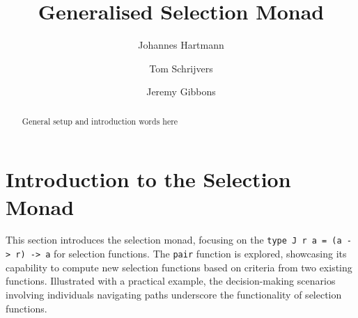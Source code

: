 \documentclass[runningheads]{llncs}
\begin{document}
\title{Generalised Selection Monad}

\author{
    Johannes Hartmann \and 
    Tom Schrijvers\and 
    Jeremy Gibbons
}
%


%
\maketitle              %
%
\begin{abstract}
General setup and introduction words here

\end{abstract}
%
%
%
\begin{Shaded}
\begin{Highlighting}[]
\end{Highlighting}
\end{Shaded}

\begin{Shaded}
\begin{Highlighting}[]
  \NormalTok{, }\NormalTok{)}
\end{Highlighting}
\end{Shaded}

\section{Introduction to the Selection
Monad}\label{introduction-to-the-selection-monad}

This section introduces the selection monad, focusing on the
\texttt{type\ J\ r\ a\ =\ (a\ -\textgreater{}\ r)\ -\textgreater{}\ a}
for selection functions. The \texttt{pair} function is explored,
showcasing its capability to compute new selection functions based on
criteria from two existing functions. Illustrated with a practical
example, the decision-making scenarios involving individuals navigating
paths underscore the functionality of selection functions.
\end{document}
